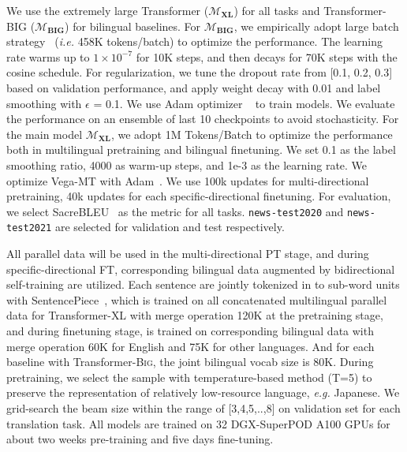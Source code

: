 \documentclass[11pt,a4paper]{article}
\newcommand{\zct}{\color{black}}
\begin{document}
We use the extremely large Transformer ($\mathcal{M}_\textbf{XL}$) for all tasks and Transformer-\textsc{BIG} ($\mathcal{M}_\textbf{BIG}$) for bilingual baselines.
For $\mathcal{M}_\textbf{BIG}$, we empirically adopt large batch strategy~\cite{edunov2018understanding} (\textit{i.e.} 458K tokens/batch) to optimize the performance. The learning rate warms up to $1\times10^{-7}$ for 10K steps, and then decays for 70K steps with the cosine schedule. For regularization, we tune the dropout rate from [0.1, 0.2, 0.3] based on validation performance, and apply weight decay with 0.01 and label smoothing with $\epsilon$ = 0.1. We use Adam optimizer ~\citep{kingma2015adam} to train models. We evaluate the performance on an ensemble of last 10 checkpoints to avoid stochasticity.
For the main model $\mathcal{M}_\textbf{XL}$, we adopt 1M Tokens/Batch to optimize the performance both in multilingual pretraining and bilingual finetuning. 
We set 0.1 as the label smoothing ratio, 4000 as warm-up steps, and 1e-3 as the learning rate. We optimize Vega-MT with Adam~\cite{kingma2015adam}. We use 100k updates for multi-directional pretraining, 40k updates for each specific-directional finetuning.
For evaluation, we select SacreBLEU~\cite{post-2018-call} as the metric for all tasks. \texttt{news-test2020} and \texttt{news-test2021} are selected for validation and test respectively. 

All parallel data will be used in the multi-directional PT stage, and during specific-directional FT, corresponding bilingual data augmented by bidirectional self-training are utilized.
Each sentence are jointly tokenized in to sub-word units with  SentencePiece~\cite{kudo-richardson-2018-sentencepiece}, which is trained on all concatenated multilingual parallel data for Transformer-\textsc{XL} with merge operation 120K at the pretraining stage, and during finetuning stage, is trained on corresponding bilingual data with merge operation 60K for English and 75K for other languages.
And for each baseline with Transformer-\textsc{Big}, the joint bilingual vocab size is 80K.
During pretraining, we select the sample with temperature-based method (T=5) to preserve the representation of relatively low-resource language, \textit{e.g.} Japanese.
We grid-search the beam size within the range of [3,4,5,..,8] on validation set for each translation task.
All models are trained on 32 DGX-SuperPOD A100 GPUs {\zct for about two weeks pre-training and five days fine-tuning. }
\end{document}
